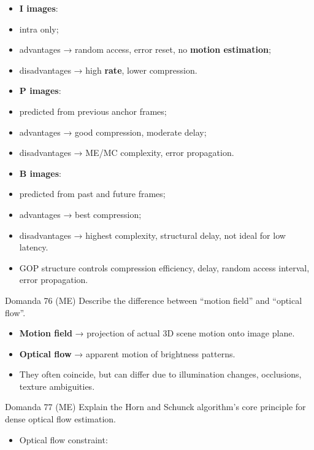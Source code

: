 \begin{itemize}
  \item \textbf{I images}:
  \item intra only;
  \item advantages → random access, error reset, no \textbf{motion estimation};
  \item disadvantages → high \textbf{rate}, lower compression.
  \item \textbf{P images}:
  \item predicted from previous anchor frames;
  \item advantages → good compression, moderate delay;
  \item disadvantages → ME/MC complexity, error propagation.
  \item \textbf{B images}:
  \item predicted from past and future frames;
  \item advantages → best compression;
  \item disadvantages → highest complexity, structural delay, not ideal for low latency.
  \item GOP structure controls compression efficiency, delay, random access interval, error propagation.
\end{itemize}



\begin{questionbox}{Domanda 76}
(ME) Describe the difference between “motion field” and “optical flow”.
\end{questionbox}


\begin{itemize}
  \item \textbf{Motion field} → projection of actual 3D scene motion onto image plane.
  \item \textbf{Optical flow} → apparent motion of brightness patterns.
  \item They often coincide, but can differ due to illumination changes, occlusions, texture ambiguities.
\end{itemize}



\begin{questionbox}{Domanda 77}
(ME) Explain the Horn and Schunck algorithm’s core principle for dense optical flow estimation.
\end{questionbox}


\begin{itemize}
  \item Optical flow constraint:
\end{itemize}


